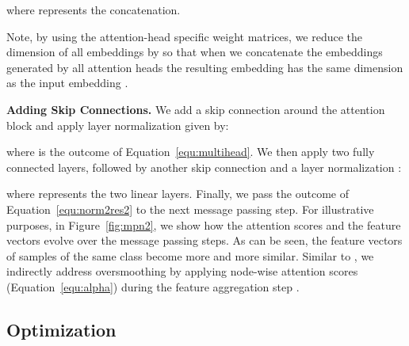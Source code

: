 \documentclass{article}
\begin{document}
where  represents the concatenation.

Note, by using the attention-head specific weight matrices, we reduce the dimension of all embeddings  by  so that when we concatenate the embeddings generated by all attention heads the resulting embedding  has the same dimension as the input embedding .

\noindent\textbf{Adding Skip Connections.} We add a skip connection around the attention block \cite{7780459} and apply layer normalization \cite{DBLP:journals/corr/BaKH16} given by:


where  is the outcome of Equation~\ref{equ:multihead}. We then apply two fully connected layers, followed by another skip connection \cite{7780459} and a layer normalization \cite{DBLP:journals/corr/BaKH16}: 


where  represents the two linear layers. Finally, we pass the outcome of Equation~\ref{equ:norm2res2} to the next message passing step. 
For illustrative purposes, in Figure~\ref{fig:mpn2}, we show how the attention scores and the feature vectors evolve over the message passing steps. 
As can be seen, the feature vectors of samples of the same class become more and more similar. 
Similar to \cite{DBLP:conf/iclr/VelickovicCCRLB18}, we indirectly address oversmoothing by applying node-wise attention scores  (Equation~\ref{equ:alpha}) during the feature aggregation step \cite{DBLP:conf/nips/Min2020}. 

\iffalse
\begin{figure*}
\begin{center}
\texttt{[image: latex/tex\_files/figures/2iter.png]}
\end{center}
   \caption{An example of a two step message passing network and how the attention scores, as well as the feature vectors, change over the steps.}
\label{fig:2iter}
\end{figure*}
\fi
\vspace{-0.3cm}
\subsection{Optimization}

\iffalse
\begin{figure}[t]
\begin{center}
\texttt{[image: latex/tex\_files/figures/kreciprocal2.png]}
\end{center}
   \caption{Reciprocal k-nearest neighbor batch sampling for MPN during inference.}
\label{fig:kreciprocal}
\end{figure}
\fi
\end{document}
